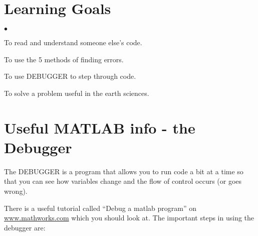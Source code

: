 \documentclass[letterpaper,12pt]{article}
\newcounter{lnum}
\newenvironment{abbrevlist}%
  {\begin{list}{$\bullet$}{\setlength{\leftmargin}{2em}%
               \setlength{\itemindent}{0em}%
               \setlength{\itemsep}{0pt}%
               \setlength{\parsep}{0pt}%
               \setlength{\topsep}{2pt}%
               \usecounter{lnum} } }{\end{list}}
\begin{document}


\section*{Learning Goals}
\begin{abbrevlist}
\item To read and understand someone else's code.
\item To use the 5 methods of finding errors.
\item To use DEBUGGER to step through code.
\item To solve a problem useful in the earth sciences.
\end{abbrevlist}




\section*{Useful MATLAB info - the Debugger}
\vspace{-12pt}

The DEBUGGER  is a program that allows you to run code a bit at a time
so that you can see how variables change and the flow of control occurs (or goes wrong). 

There is a useful tutorial called ``Debug a matlab program'' on \url{www.mathworks.com} which you
should look at. The important steps in using the debugger are:
\end{document}
